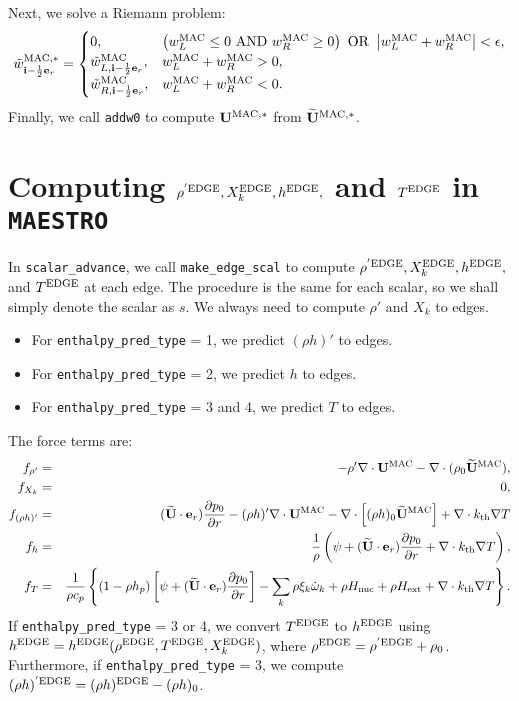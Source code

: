 \documentclass[11pt]{article}
\def\half  {\frac{1}{2}}
\def\kth   {k_{\rm th}}
\def\edge  {\rm EDGE}
\def\mac   {\rm MAC}
\def\eb    {{\bf e}}
\def\ib    {{\bf i}}
\def\Ub    {{\bf U}}
\def\Ubt   {\widetilde{\bf U}}
\def\wt    {\tilde{w}}
\begin{document}
Next, we solve a Riemann problem:
\begin{equation}
\wt_{\ib-\half\eb_r}^{\mac,*} =
\begin{cases}
0, & \left(w_L^{\mac} \le 0 ~ {\rm AND} ~ w_R^{\mac} \ge 0\right) ~ {\rm OR} ~ \left|w_L^{\mac} + w_R^{\mac}\right| < \epsilon, \\
\wt_{L,\ib-\half\eb_r}^{\mac}, & w_L^{\mac} + w_R^{\mac} > 0, \\
\wt_{R,\ib-\half\eb_r}^{\mac}, & w_L^{\mac} + w_R^{\mac} < 0. 
\end{cases}
\end{equation}
Finally, we call {\tt addw0} to compute $\Ub^{\mac,*}$ from $\Ubt^{\mac,*}$.
\cleardoublepage
\section{Computing $\rho^{'\edge}, X_k^{\edge}, h^{\edge},$ and $T^{\edge}$ in {\tt MAESTRO}}
In {\tt scalar\_advance}, we call {\tt make\_edge\_scal} to compute $\rho^{'\edge}, X_k^{\edge}, h^{\edge},$ and $T^{\edge}$ at each edge.  The procedure is the same for each scalar, so we shall simply denote the scalar as $s$.  We always need to compute $\rho'$ and $X_k$ to edges.
\begin{itemize}
\item For {\tt enthalpy\_pred\_type} = 1, we predict $(\rho h)'$ to edges.
\item For {\tt enthalpy\_pred\_type} = 2, we predict $h$ to edges.
\item For {\tt enthalpy\_pred\_type} = 3 and 4, we predict $T$ to edges.
\end{itemize}
The force terms are:
\begin{eqnarray}
f_{\rho'} &=& -\rho'\nabla\cdot\Ub^{\mac} - \nabla\cdot(\rho_0\Ubt^{\mac}), \\
f_{X_k} &=& 0, \\
f_{(\rho h)'} &=& (\Ubt\cdot\eb_r)\frac{\partial p_0}{\partial r} -(\rho h)'\nabla\cdot\Ub^{\mac} - \nabla\cdot\left[(\rho h)_0\Ubt^{\mac}\right] + \nabla\cdot\kth\nabla T \\
f_h &=& \frac{1}{\rho}\left(\psi + (\Ubt\cdot\eb_r)\frac{\partial p_0}{\partial r} + \nabla\cdot\kth\nabla T \right), \\
f_T &=& \frac{1}{\rho c_p}\left\{(1-\rho h_p)\left[\psi + (\Ubt\cdot\eb_r)\frac{\partial p_0}{\partial r}\right] - \sum_k\rho\xi_k\dot\omega_k + \rho H_{\rm nuc} + \rho H_{\rm ext} + \nabla\cdot\kth\nabla T \right\}.\nonumber \\
\end{eqnarray}
If {\tt enthalpy\_pred\_type} = 3 or 4, we convert $T^{\edge}$ to $h^{\edge}$ using $h^{\edge} = h^{\edge}(\rho^{\edge},T^{\edge},X_k^{\edge})$, where $\rho^{\edge} = \rho^{'\edge} + \rho_0$.  Furthermore, if {\tt enthalpy\_pred\_type} = 3, we compute $(\rho h)^{'\edge} = (\rho h)^{\edge} - (\rho h)_0$.
\end{document}

